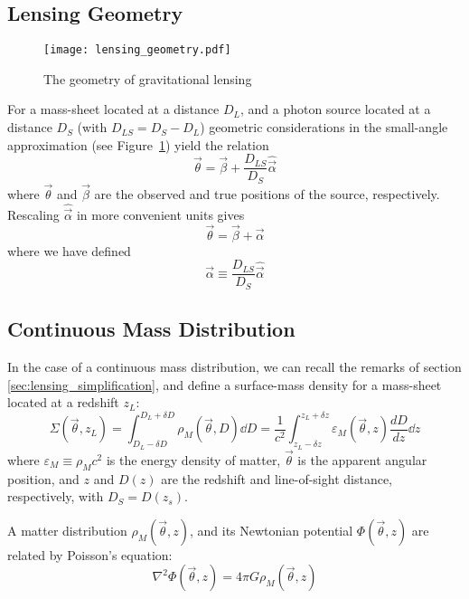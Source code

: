 \subsection{Lensing Geometry}

\begin{figure}
  \texttt{[image: lensing\_geometry.pdf]}
  \caption{The geometry of gravitational lensing}
  \label{fig:lensing_geometry}
\end{figure}

For a mass-sheet located at a distance $D_L$, and a photon source located at a distance $D_S$ (with $D_{LS} = D_S - D_L$) geometric considerations in the small-angle approximation (see Figure~\ref{fig:lensing_geometry}) yield the relation
\begin{equation}
  \vec{\theta} = \vec{\beta} + \frac{D_{LS}}{D_S}\hat{\vec{\alpha}}
\end{equation}
where $\vec{\theta}$ and $\vec{\beta}$ are the observed and true positions of the source, respectively.  Rescaling $\hat{\vec{\alpha}}$ in more convenient units gives
\begin{equation}
  \label{eq:mapping}
  \vec{\theta} = \vec{\beta} + \vec{\alpha}
\end{equation}
where we have defined
\begin{equation}
  \label{eq:alpha-def2}
  \vec{\alpha} \equiv \frac{D_{LS}}{D_S}\hat{\vec{\alpha}}
\end{equation}

\subsection{Continuous Mass Distribution}
In the case of a continuous mass distribution, we can recall the remarks of section \ref{sec:lensing_simplification}, and define a surface-mass density for a mass-sheet located at a redshift $z_L$:
\begin{equation}
  \label{eq:sigma-def}
  \Sigma(\vec{\theta},z_L) 
  = \int_{D_L-\delta D}^{D_L+\delta D}\rho_M(\vec{\theta},D)\dd D 
  = \frac{1}{c^2}\int_{z_L - \delta z}^{z_L + \delta z} 
  \varepsilon_M(\vec{\theta},z)\frac{dD}{dz}\dd z
\end{equation}
where $\varepsilon_M \equiv \rho_M c^2$ is the energy density of matter,
$\vec{\theta}$ is the apparent angular position, and $z$ and $D(z)$ are the 
redshift and line-of-sight distance, respectively, with $D_S = D(z_s)$.  

A matter distribution $\rho_M(\vec{\theta},z)$, and its Newtonian potential $\Phi(\vec{\theta},z)$ are related by Poisson's equation:
\begin{equation}
  \label{eq:poisson}
  \nabla^2 \Phi(\vec{\theta},z) = 4\pi G \rho_M(\vec{\theta},z)
\end{equation}

